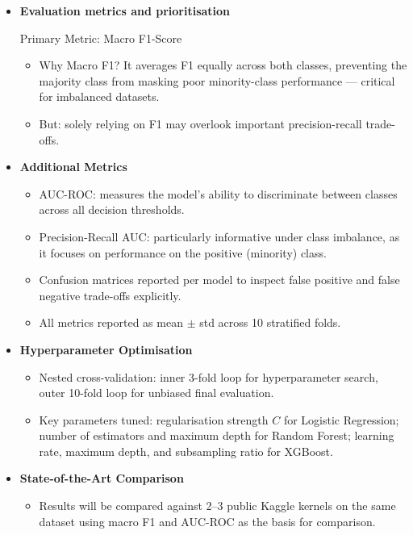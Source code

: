 \documentclass[11pt, a4paper]{article}
\begin{document}
\begin{itemize}
  \item \textbf{Evaluation metrics and prioritisation}

  Primary Metric: Macro F1-Score
  \begin{itemize}
    \item Why Macro F1? It averages F1 equally across both classes, preventing the
          majority class from masking poor minority-class performance --- critical for
          imbalanced datasets.
    \item But: solely relying on F1 may overlook important precision-recall trade-offs.
  \end{itemize}

  \item \textbf{Additional Metrics}
  \begin{itemize}
    \item AUC-ROC: measures the model's ability to discriminate between classes
          across all decision thresholds.
    \item Precision-Recall AUC: particularly informative under class imbalance, as
          it focuses on performance on the positive (minority) class.
    \item Confusion matrices reported per model to inspect false positive and false
          negative trade-offs explicitly.
    \item All metrics reported as mean $\pm$ std across 10 stratified folds.
  \end{itemize}

  \item \textbf{Hyperparameter Optimisation}
  \begin{itemize}
    \item Nested cross-validation: inner 3-fold loop for hyperparameter search,
          outer 10-fold loop for unbiased final evaluation.
    \item Key parameters tuned: regularisation strength $C$ for Logistic Regression;
          number of estimators and maximum depth for Random Forest; learning rate,
          maximum depth, and subsampling ratio for XGBoost.
  \end{itemize}

  \item \textbf{State-of-the-Art Comparison}
  \begin{itemize}
    \item Results will be compared against 2--3 public Kaggle kernels on the same
          dataset using macro F1 and AUC-ROC as the basis for comparison.
  \end{itemize}
\end{itemize}
\end{document}
